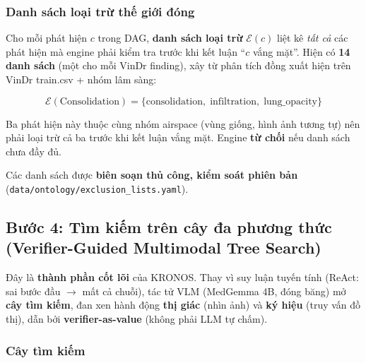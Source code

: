 \documentclass[11pt,a4paper]{article}
\begin{document}
\subsubsection{Danh sách loại trừ thế giới đóng}
Cho mỗi phát hiện $c$ trong DAG, \textbf{danh sách loại trừ} $\mathcal{E}(c)$ liệt kê \emph{tất cả} các phát hiện mà engine phải kiểm tra trước khi kết luận ``$c$ vắng mặt''. Hiện có \textbf{14 danh sách} (một cho mỗi VinDr finding), xây từ phân tích đồng xuất hiện trên VinDr train.csv + nhóm lâm sàng:

\begin{equation}
\mathcal{E}(\text{Consolidation}) = \{\text{consolidation},\; \text{infiltration},\; \text{lung\_opacity}\}
\end{equation}

Ba phát hiện này thuộc cùng nhóm airspace (vùng giống, hình ảnh tương tự) nên phải loại trừ cả ba trước khi kết luận vắng mặt. Engine \textbf{từ chối} nếu danh sách chưa đầy đủ.

Các danh sách được \textbf{biên soạn thủ công, kiểm soát phiên bản} (\texttt{data/ontology/exclusion\_lists.yaml}).


\subsection{Bước 4: Tìm kiếm trên cây đa phương thức (Verifier-Guided Multimodal Tree Search)}

Đây là \textbf{thành phần cốt lõi} của KRONOS. Thay vì suy luận tuyến tính (ReAct: sai bước đầu $\to$ mất cả chuỗi), tác tử VLM (MedGemma 4B, đóng băng) mở \textbf{cây tìm kiếm}, đan xen hành động \textbf{thị giác} (nhìn ảnh) và \textbf{ký hiệu} (truy vấn đồ thị), dẫn bởi \textbf{verifier-as-value} (không phải LLM tự chấm).

\subsubsection{Cây tìm kiếm}
\end{document}
